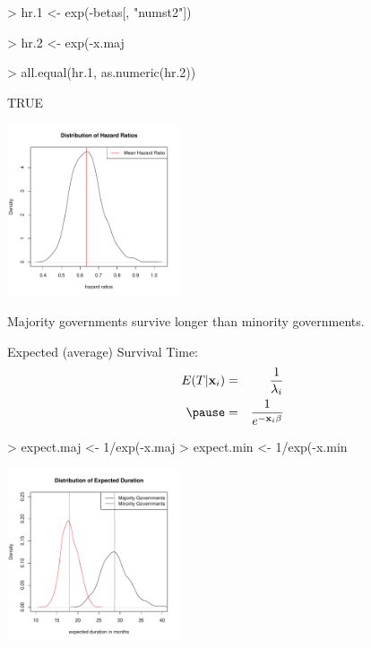 \documentclass{beamer}
\begin{document}
\begin{frame}[fragile]
\tiny
\begin{Schunk}
\begin{Sinput}
> hr.1 <- exp(-betas[, "numst2"])
\end{Sinput}
\end{Schunk}
\pause
\begin{Schunk}
\begin{Sinput}
> hr.2 <- exp(-x.maj %
\end{Sinput}
\end{Schunk}
\pause
\begin{Schunk}
\begin{Sinput}
> all.equal(hr.1, as.numeric(hr.2))
\end{Sinput}
\begin{Soutput}
[1] TRUE
\end{Soutput}
\end{Schunk}
\pause

\begin{center}
\includegraphics[width = 2in, height = 2in]{survival_present-hr.pdf}
\end{center}
\normalsize
\pause
Majority governments survive longer than minority governments.
\end{frame}

\begin{frame}[fragile]
Expected (average) Survival Time:
\pause
\begin{eqnarray*}
E(T | \mathbf{x}_i) &=& \frac{1}{\lambda_i}\\
\pause
&=& \frac{1}{e^{-\mathbf{x}_i \beta}}
\end{eqnarray*}
\pause
\tiny
\begin{Schunk}
\begin{Sinput}
> expect.maj <- 1/exp(-x.maj %
> expect.min <- 1/exp(-x.min %
\end{Sinput}
\end{Schunk}
\pause
\begin{center}
\includegraphics[width = 2in, height = 2in]{survival_present-expected.pdf}
\end{center}

\end{frame}
\end{document}
